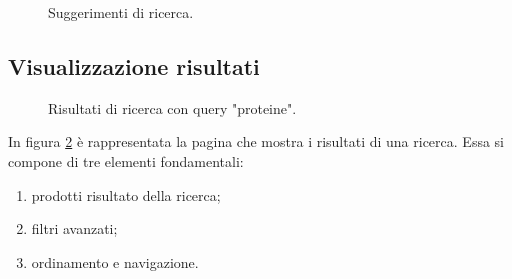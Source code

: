 \begin{figure}[!htb]
	\caption{\label{fig:figura6}} Suggerimenti di ricerca.
\end{figure}

\subsection{Visualizzazione risultati}
\begin{figure}[!htb]
	\caption{\label{fig:figura7}} Risultati di ricerca con query "proteine".
\end{figure}
In figura \ref{fig:figura7} è rappresentata la pagina che mostra i risultati di una ricerca. Essa si compone di tre elementi fondamentali:
\begin{enumerate}
    \item prodotti risultato della ricerca;
    \item filtri avanzati;
    \item ordinamento e navigazione.
\end{enumerate}
